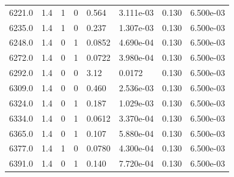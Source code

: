 \documentclass[preview]{standalone}
\begin{document}
{{{{{{{{{{{\begin{tabular}{L{1.2cm}C{1.2cm} C{0.3cm}C{0.5cm} C{1.4cm}C{1.4cm} C{1.4cm}C{1.4cm}}
  6221.0  &   1.4  & 1     &  0 &  0.564  & 3.111e-03  & 0.130 &  6.500e-03   \\ 
  6235.0  &   1.4  & 1     &  0 &  0.237  & 1.307e-03  & 0.130 &  6.500e-03   \\ 
  6248.0  &   1.4  & 0     &  1 &  0.0852  & 4.690e-04  & 0.130 &  6.500e-03   \\ 
  6272.0  &   1.4  & 0     &  1 &  0.0722  & 3.980e-04  & 0.130 &  6.500e-03   \\ 
  6292.0  &   1.4  & 0     &  0 &  3.12  & 0.0172  & 0.130 &  6.500e-03   \\ 
  6309.0  &   1.4  & 0     &  0 &  0.460  & 2.536e-03  & 0.130 &  6.500e-03   \\ 
  6324.0  &   1.4  & 0     &  1 &  0.187  & 1.029e-03  & 0.130 &  6.500e-03   \\ 
  6334.0  &   1.4  & 0     &  1 &  0.0612  & 3.370e-04  & 0.130 &  6.500e-03   \\ 
  6365.0  &   1.4  & 0     &  1 &  0.107  & 5.880e-04  & 0.130 &  6.500e-03   \\ 
  6377.0  &   1.4  & 1     &  0 &  0.0780  & 4.300e-04  & 0.130 &  6.500e-03   \\ 
  6391.0  &   1.4  & 0     &  1 &  0.140  & 7.720e-04  & 0.130 &  6.500e-03   \\ 
\hline 
\end{tabular} 

}}}}}}}}}}}
\end{document}
